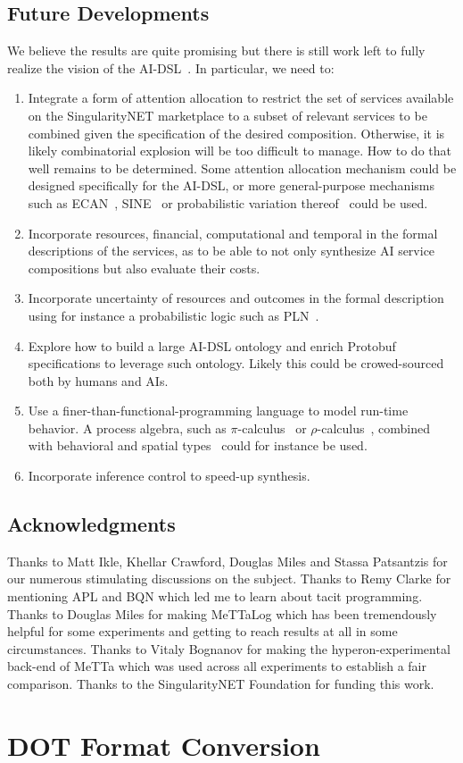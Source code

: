 \documentclass[]{report}
\begin{document}
\section{Future Developments}
We believe the results are quite promising but there is still work
left to fully realize the vision of the
AI-DSL~\cite{GoertzelGeisweillerBlog}.  In particular, we need to:
\begin{enumerate}
\item Integrate a form of attention allocation to restrict the set of
  services available on the SingularityNET marketplace to a subset of
  relevant services to be combined given the specification of the
  desired composition.  Otherwise, it is likely combinatorial
  explosion will be too difficult to manage.  How to do that well
  remains to be determined.  Some attention allocation mechanism could
  be designed specifically for the AI-DSL, or more general-purpose
  mechanisms such as ECAN~\cite{Pitt2009}, SINE~\cite{Hoder2011} or
  probabilistic variation thereof~\cite{Agnieszka2019} could be used.
\item Incorporate resources, financial, computational and temporal in
  the formal descriptions of the services, as to be able to not only
  synthesize AI service compositions but also evaluate their costs.
\item Incorporate uncertainty of resources and outcomes in the formal
  description using for instance a probabilistic logic such as
  PLN~\cite{Goertzel09PLN}.
\item Explore how to build a large AI-DSL ontology and enrich Protobuf
  specifications to leverage such ontology.  Likely this could be
  crowed-sourced both by humans and AIs.
\item Use a finer-than-functional-programming language to model
  run-time behavior.  A process algebra, such as
  $\pi$-calculus~\cite{Milner1999} or
  $\rho$-calculus~\cite{Meredith2005}, combined with behavioral and
  spatial types~\cite{Acciai2010} could for instance be used.
\item Incorporate inference control to speed-up synthesis.
\end{enumerate}

\section{Acknowledgments}
Thanks to Matt Ikle, Khellar Crawford, Douglas Miles and Stassa
Patsantzis for our numerous stimulating discussions on the subject.
Thanks to Remy Clarke for mentioning APL and BQN which led me to learn
about tacit programming.  Thanks to Douglas Miles for making
\mbox{MeTTaLog} which has been tremendously helpful for some
experiments and getting to reach results at all in some circumstances.
Thanks to Vitaly Bognanov for making the hyperon-experimental back-end
of MeTTa which was used across all experiments to establish a fair
comparison.  Thanks to the SingularityNET Foundation for funding this
work.

\appendix
\chapter{DOT Format Conversion}
\label{apdx:dot}

 
\end{document}
